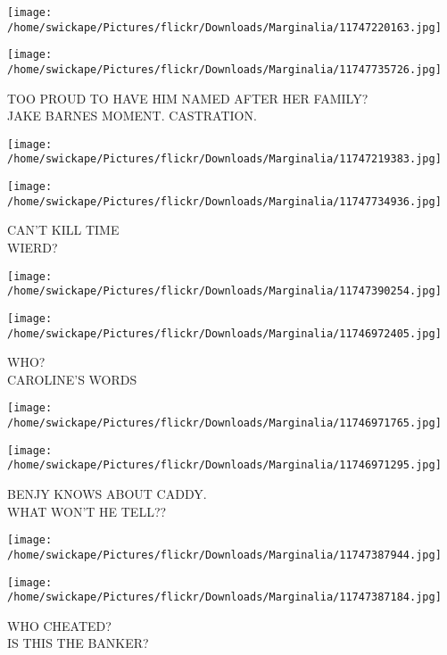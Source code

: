 \documentclass[10pt,letterpaper]{article}
\begin{document}
\texttt{[image: /home/swickape/Pictures/flickr/Downloads/Marginalia/11747220163.jpg]}

\vspace{0.25in}
\texttt{[image: /home/swickape/Pictures/flickr/Downloads/Marginalia/11747735726.jpg]}

TOO PROUD TO HAVE HIM NAMED AFTER HER FAMILY?\\
JAKE BARNES MOMENT. CASTRATION.\\
\pagebreak

\texttt{[image: /home/swickape/Pictures/flickr/Downloads/Marginalia/11747219383.jpg]}

\vspace{0.25in}
\texttt{[image: /home/swickape/Pictures/flickr/Downloads/Marginalia/11747734936.jpg]}

CAN'T KILL TIME\\
WIERD?\\
\pagebreak

\texttt{[image: /home/swickape/Pictures/flickr/Downloads/Marginalia/11747390254.jpg]}

\vspace{0.25in}
\texttt{[image: /home/swickape/Pictures/flickr/Downloads/Marginalia/11746972405.jpg]}

WHO?\\
CAROLINE'S WORDS\\
\pagebreak

\texttt{[image: /home/swickape/Pictures/flickr/Downloads/Marginalia/11746971765.jpg]}

\vspace{0.25in}
\texttt{[image: /home/swickape/Pictures/flickr/Downloads/Marginalia/11746971295.jpg]}

BENJY KNOWS ABOUT CADDY.\\
WHAT WON'T HE TELL??\\
\pagebreak

\texttt{[image: /home/swickape/Pictures/flickr/Downloads/Marginalia/11747387944.jpg]}

\vspace{0.25in}
\texttt{[image: /home/swickape/Pictures/flickr/Downloads/Marginalia/11747387184.jpg]}

WHO CHEATED?\\
IS THIS THE BANKER?\\
\pagebreak
\end{document}
